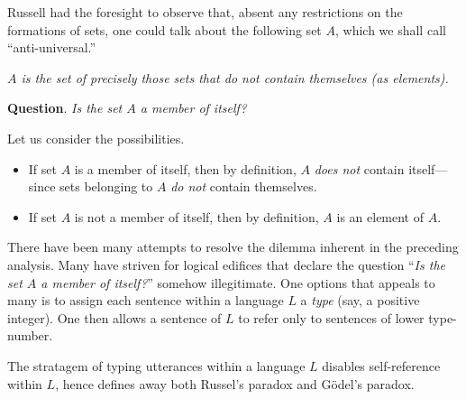Russell had the foresight to observe that, absent any restrictions on
the formations of sets, one could talk about the following set $A$,
which we shall call ``anti-universal.''

{\em $A$ is the set of precisely those sets that {\em do not} contain themselves
  (as elements).}

\noindent
{\bf Question}.  {\it Is the set $A$ a member of itself?}

\noindent
Let us consider the possibilities.
\begin{itemize}
\item
If set $A$ is a member of itself, then by definition, $A$ {\em does
  not} contain itself---since sets belonging to $A$ {\em do not}
contain themselves.

\item
If set $A$ is not a member of itself, then by definition, $A$ is an
element of $A$.
\end{itemize}

There have been many attempts to resolve the dilemma inherent in the
preceding analysis.  Many have striven for logical edifices that
declare the question ``{\it Is the set $A$ a member of itself?}''
somehow illegitimate.  One options that appeals to many is to assign
each sentence within a language $L$ a {\it type} (say, a positive
integer).  One then allows a sentence of $L$ to refer only to
sentences of lower type-number.

The stratagem of typing utterances within a language $L$ disables
self-reference within $L$, hence defines away both Russel's paradox
and G\"{o}del's paradox.



